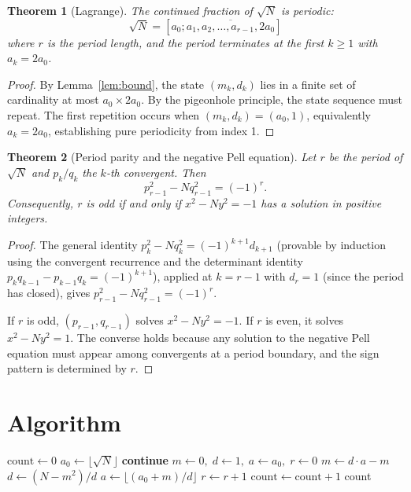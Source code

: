 \documentclass[12pt,a4paper]{article}
\newtheorem{theorem}{Theorem}
\begin{document}
\begin{theorem}[Lagrange]
\label{thm:lagrange}
The continued fraction of $\sqrt{N}$ is periodic:
\[
\sqrt{N} = [a_0; \overline{a_1, a_2, \ldots, a_{r-1}, 2a_0}]
\]
where $r$ is the period length, and the period terminates at the first $k \ge 1$ with $a_k = 2a_0$.
\end{theorem}

\begin{proof}
By Lemma~\ref{lem:bound}, the state $(m_k, d_k)$ lies in a finite set of cardinality at most $a_0 \times 2a_0$. By the pigeonhole principle, the state sequence must repeat. The first repetition occurs when $(m_k, d_k) = (a_0, 1)$, equivalently $a_k = 2a_0$, establishing pure periodicity from index 1.
\end{proof}

\begin{theorem}[Period parity and the negative Pell equation]
\label{thm:parity}
Let $r$ be the period of $\sqrt{N}$ and $p_k/q_k$ the $k$-th convergent. Then
\[
p_{r-1}^2 - N q_{r-1}^2 = (-1)^r.
\]
Consequently, $r$ is odd if and only if $x^2 - Ny^2 = -1$ has a solution in positive integers.
\end{theorem}

\begin{proof}
The general identity $p_k^2 - Nq_k^2 = (-1)^{k+1} d_{k+1}$ (provable by induction using the convergent recurrence and the determinant identity $p_k q_{k-1} - p_{k-1} q_k = (-1)^{k+1}$), applied at $k = r-1$ with $d_r = 1$ (since the period has closed), gives $p_{r-1}^2 - Nq_{r-1}^2 = (-1)^r$.

If $r$ is odd, $(p_{r-1}, q_{r-1})$ solves $x^2 - Ny^2 = -1$. If $r$ is even, it solves $x^2 - Ny^2 = 1$. The converse holds because any solution to the negative Pell equation must appear among convergents at a period boundary, and the sign pattern is determined by $r$.
\end{proof}

\section{Algorithm}

\begin{algorithm}[H]
\caption{Count non-square $N \le N_{\max}$ with odd continued fraction period}
\begin{algorithmic}[1]
\STATE $\mathrm{count} \gets 0$
    \STATE $a_0 \gets \lfloor \sqrt{N} \rfloor$
        \STATE \textbf{continue}
    \ENDIF
    \STATE $m \gets 0,\; d \gets 1,\; a \gets a_0,\; r \gets 0$
    \REPEAT
        \STATE $m \gets d \cdot a - m$
        \STATE $d \gets (N - m^2) / d$
        \STATE $a \gets \lfloor (a_0 + m) / d \rfloor$
        \STATE $r \gets r + 1$
        \STATE $\mathrm{count} \gets \mathrm{count} + 1$
    \ENDIF
\ENDFOR
\RETURN count
\end{algorithmic}
\end{algorithm}
\end{document}
